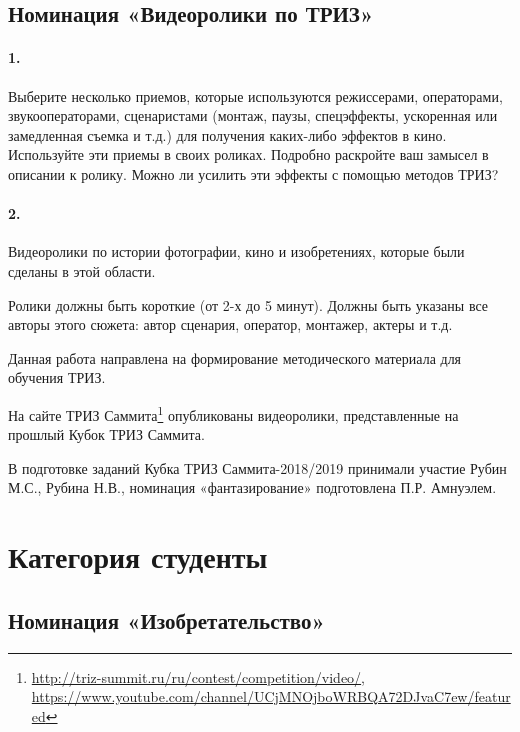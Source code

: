 \documentclass[11pt,a4paper]{article}
\newcommand{\video}{Ролики должны быть короткие (от 2-х до 5 минут). Должны
  быть указаны все авторы этого сюжета: автор сценария, оператор, монтажер,
  актеры и т.д.

Данная работа направлена на формирование методического материала для обучения
ТРИЗ.

На сайте ТРИЗ
Саммита\footnote{\url{http://triz-summit.ru/ru/contest/competition/video/},\\
  \url{https://www.youtube.com/channel/UCjMNOjboWRBQA72DJvaC7ew/featured}}
опубликованы видеоролики, представленные на прошлый Кубок ТРИЗ Саммита.}
\newcommand{\credentials}{В подготовке заданий Кубка ТРИЗ Саммита-2018/2019
  принимали участие Рубин М.С., Рубина Н.В., номинация «фантазирование»
  подготовлена П.Р. Амнуэлем.}
\begin{document}
\subsection*{Номинация «Видеоролики по ТРИЗ»}

\paragraph{1.}
Выберите несколько приемов, которые используются режиссерами, операторами,
звукооператорами, сценаристами (монтаж, паузы, спецэффекты, ускоренная или
замедленная съемка и т.д.) для получения каких-либо эффектов в
кино. Используйте эти приемы в своих роликах. Подробно раскройте ваш замысел в
описании к ролику. Можно ли усилить эти эффекты с помощью методов ТРИЗ?

\paragraph{2.}
Видеоролики по истории фотографии, кино и изобретениях, которые были сделаны в
этой области.

\video\par\credentials
\clearpage

\section*{Категория студенты}

\subsection*{Номинация «Изобретательство»}
\end{document}
